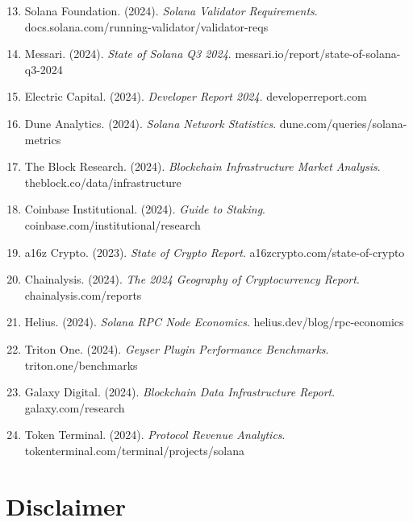 \documentclass[12pt,a4paper]{article}
\begin{document}
\begin{enumerate}
    \setcounter{enumi}{12}

    \item Solana Foundation. (2024). \textit{Solana Validator Requirements}. docs.solana.com/running-validator/validator-reqs

    \item Messari. (2024). \textit{State of Solana Q3 2024}. messari.io/report/state-of-solana-q3-2024

    \item Electric Capital. (2024). \textit{Developer Report 2024}. developerreport.com

    \item Dune Analytics. (2024). \textit{Solana Network Statistics}. dune.com/queries/solana-metrics

    \item The Block Research. (2024). \textit{Blockchain Infrastructure Market Analysis}. theblock.co/data/infrastructure

    \item Coinbase Institutional. (2024). \textit{Guide to Staking}. coinbase.com/institutional/research

    \item a16z Crypto. (2023). \textit{State of Crypto Report}. a16zcrypto.com/state-of-crypto

    \item Chainalysis. (2024). \textit{The 2024 Geography of Cryptocurrency Report}. chainalysis.com/reports

    \item Helius. (2024). \textit{Solana RPC Node Economics}. helius.dev/blog/rpc-economics

    \item Triton One. (2024). \textit{Geyser Plugin Performance Benchmarks}. triton.one/benchmarks

    \item Galaxy Digital. (2024). \textit{Blockchain Data Infrastructure Report}. galaxy.com/research

    \item Token Terminal. (2024). \textit{Protocol Revenue Analytics}. tokenterminal.com/terminal/projects/solana
\end{enumerate}

\section*{Disclaimer}
\end{document}
